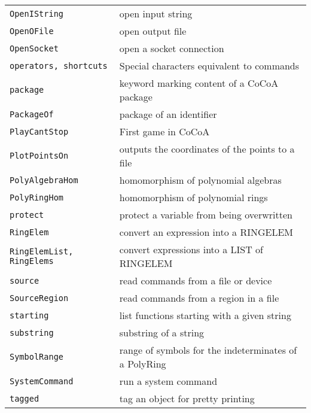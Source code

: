\documentclass[a4paper]{mybook}
\begin{document}
\begin{center}
\begin{longtable}{ll}
{\verb~OpenIString~} &
      open input string\\
   
{\verb~OpenOFile~} &
      open output file\\
   
{\verb~OpenSocket~} &
      open a socket connection\\
   
{\verb~operators, shortcuts~} &
      Special characters equivalent to commands\\
   
{\verb~package~} &
      keyword marking content of a CoCoA package\\
   
{\verb~PackageOf~} &
      package of an identifier\\
   
{\verb~PlayCantStop~} &
      First game in CoCoA\\
   
{\verb~PlotPointsOn~} &
      outputs the coordinates of the points to a file\\
   
{\verb~PolyAlgebraHom~} &
      homomorphism of polynomial algebras\\
   
{\verb~PolyRingHom~} &
      homomorphism of polynomial rings\\
   
{\verb~protect~} &
      protect a variable from being overwritten\\
   
{\verb~RingElem~} &
      convert an expression into a RINGELEM\\
   
{\verb~RingElemList, RingElems~} &
      convert expressions into a LIST of RINGELEM\\
   
{\verb~source~} &
      read commands from a file or device\\
   
{\verb~SourceRegion~} &
      read commands from a region in a file\\
   
{\verb~starting~} &
      list functions starting with a given string\\
   
{\verb~substring~} &
      substring of a string\\
   
{\verb~SymbolRange~} &
      range of symbols for the indeterminates of a PolyRing\\
   
{\verb~SystemCommand~} &
      run a system command\\
   
{\verb~tagged~} &
      tag an object for pretty printing\\
   
\end{longtable}
\end{center}
\end{document}
